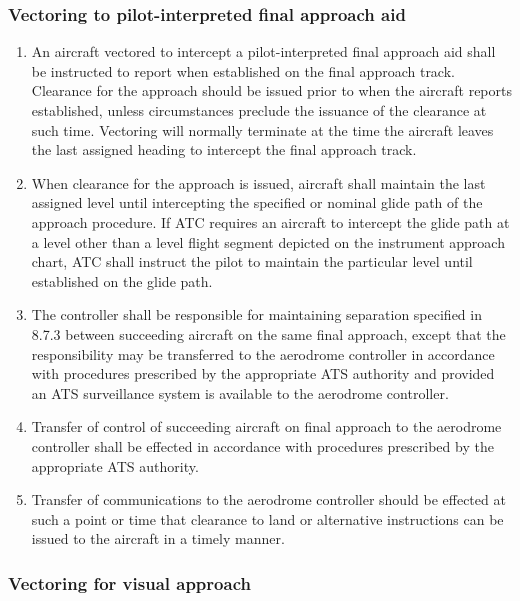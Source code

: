 \subsubsection{Vectoring to pilot-interpreted final approach aid}

\begin{enumerate}
    \item An aircraft vectored to intercept a pilot-interpreted final approach aid shall be instructed to report when established on the final approach track. Clearance for the approach should be issued prior to when the aircraft reports established, unless circumstances preclude the issuance of the clearance at such time. Vectoring will normally terminate at the time the aircraft leaves the last assigned heading to intercept the final approach track.
    \item When clearance for the approach is issued, aircraft shall maintain the last assigned level until intercepting the specified or nominal glide path of the approach procedure. If ATC requires an aircraft to intercept the glide path at a level other than a level flight segment depicted on the instrument approach chart, ATC shall instruct the pilot to maintain the particular level until established on the glide path.
    \item The controller shall be responsible for maintaining separation specified in 8.7.3 between succeeding aircraft on the same final approach, except that the responsibility may be transferred to the aerodrome controller in accordance with procedures prescribed by the appropriate ATS authority and provided an ATS surveillance system is available to the aerodrome controller.
    \item Transfer of control of succeeding aircraft on final approach to the aerodrome controller shall be effected in accordance with procedures prescribed by the appropriate ATS authority.
    \item Transfer of communications to the aerodrome controller should be effected at such a point or time that clearance to land or alternative instructions can be issued to the aircraft in a timely manner.
\end{enumerate}

\subsubsection{Vectoring for visual approach}


